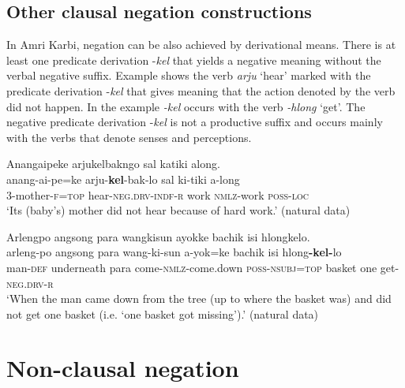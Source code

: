 \documentclass[output=paper,colorlinks,citecolor=brown]{langscibook}
\begin{document}
\subsection{Other clausal negation constructions}\label{sec:amr:2.6}
In Amri Karbi, negation can be also achieved by derivational means. There is at least one predicate derivation -\textit{kel} that yields a negative meaning without the verbal negative suffix. Example  shows the verb \textit{arju} ‘hear’ marked with the predicate derivation -\textit{kel} that gives meaning that the action denoted by the verb did not happen. In the example  \textit{{}-kel} occurs with the verb \textit{{}-hlong} ‘get’. The negative predicate derivation -\textit{kel} is not a productive suffix and occurs mainly with the verbs that denote senses and perceptions.

\ea\label{ex:amr:35}Anangaipeke arjukelbakngo sal katiki along.\\
    \gll anang-ai-pe=ke arju-\textbf{kel}{}-bak-lo sal ki-tiki a-long\\
         3-mother-\textsc{f=top} hear-\textsc{neg.drv}{}-\textsc{indf}{}-\textsc{r} work \textsc{nmlz}{}-work \textsc{poss}{}-\textsc{loc}\\
    \glt ‘Its (baby’s) mother did not hear because of hard work.’  (natural data)
\z

\ea\label{ex:amr:36}Arlengpo angsong para wangkisun ayokke bachik isi hlongkelo.\\
    \gll arleng-po angsong para wang-ki-sun a-yok=ke bachik isi hlong\textbf{{}-kel-}lo\\
          man-\textsc{def} underneath para come-\textsc{nmlz}{}-come.down \textsc{poss}{}-\textsc{nsubj}=\textsc{top} basket one get-\textsc{neg}.\textsc{drv}{}-\textsc{r}\\
    \glt ‘When the man came down from the tree (up to where the basket was) and did not get one basket (i.e. ‘one basket got missing’).’ (natural data)
\z

\section{Non-clausal negation}\label{sec:amr:3}
\end{document}
